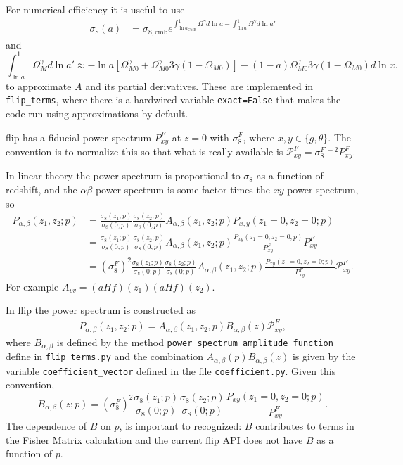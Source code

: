 \documentclass{article}
\begin{document}
For numerical efficiency it is useful to use
\begin{align}
\sigma_8(a) & =\sigma_{8,\text{cmb}}  
 e^{\int^1_{\ln{a_\text{CMB}}} \Omega^\gamma d\ln{a} - \int_{\ln{a}}^1 \Omega^\gamma d\ln{a'} } 
\end{align}
and
\begin{equation}
\int_{\ln{a}}^1 \Omega_M^\gamma d\ln{a'} \approx -\ln{a} \left[\Omega_{M0}^\gamma + \Omega_{M0}^\gamma 3\gamma(1-\Omega_{M0} )\right] 
- (1-a) \Omega_{M0}^\gamma 3\gamma (1-\Omega_{M0}) d\ln{x}.
\end{equation}
to approximate $A$ and its partial derivatives.  These are implemented in {\tt flip\_terms}, where there is a hardwired variable {\tt exact=False} that
makes the code run using approximations by default.

flip has a fiducial power spectrum $P^F_{xy}$ at $z=0$
with $\sigma_8^F$,
where $x,y \in \{g, \theta \}$.  The convention
is to normalize this so that what is really available is
$\mathcal{P}^F_{xy} = \sigma_8^{F\,-2} P^F_{xy}$.

In linear theory the
power spectrum is proportional to $\sigma_8$ as a function of redshift, and the $\alpha \beta$ power
spectrum is some factor times the $xy$ power spectrum, so
\begin{align}
    P_{\alpha,\beta}(z_1,z_2;p)
    &=
    \frac{\sigma_8(z_1; p)}{\sigma_{8}(0; p)}
    \frac{\sigma_8(z_2; p)}{\sigma_{8}(0; p)}
    A_{\alpha,\beta}(z_1,z_2;p) P_{x,y}(z_1=0, z_2=0;p) \\    
 & =     \frac{\sigma_8(z_1; p)}{\sigma_{8}(0; p)}
    \frac{\sigma_8(z_2; p)}{\sigma_{8}(0; p)}
    A_{\alpha,\beta}(z_1,z_2;p)
    \frac{P_{xy}(z_1=0, z_2=0;p)}
 {P^F_{xy}} P^F_{xy} \\
  & = \left(\sigma_8^{F}\right)^2 \frac{\sigma_8(z_1; p)}{\sigma_{8}(0; p)}
    \frac{\sigma_8(z_2; p)}{\sigma_{8}(0; p)}
    A_{\alpha,\beta}(z_1,z_2;p)
    \frac{P_{xy}(z_1=0, z_2=0;p)}
 {P^F_{xy}}  \mathcal{P}^F_{xy}.
\end{align}
For example $A_{vv}=(aHf)(z_1)(aHf)(z_2)$.

In flip the power spectrum is constructed as
\begin{align}
    P_{\alpha,\beta}(z_1,z_2;p) = A_{\alpha,\beta}(z_1,z_2, p) B_{\alpha,\beta}(z) \mathcal{P}^F_{xy},
\end{align}
where $B_{\alpha,\beta}$ is defined by the method {\tt power\_spectrum\_amplitude\_function} define in
{\tt flip\_terms.py} and
the combination $A_{\alpha,\beta}(p) B_{\alpha,\beta}(z)$ is given by the variable {\tt coefficient\_vector}
defined in the file {\tt coefficient.py}.
Given this convention,
\begin{equation}
    B_{\alpha,\beta}(z;p) = \left(\sigma_8^{F}\right)^2 \frac{\sigma_8(z_1; p)}{\sigma_{8}(0; p)}
    \frac{\sigma_8(z_2; p)}{\sigma_{8}(0; p)}
    \frac{P_{xy}(z_1=0, z_2=0;p)}
 {P^F_{xy}}. 
\end{equation}
The dependence of $B$ on $p$, is important to recognized: $B$ contributes to terms in the Fisher Matrix calculation and the current flip API does not have
$B$ as a function of $p$.
\end{document}
